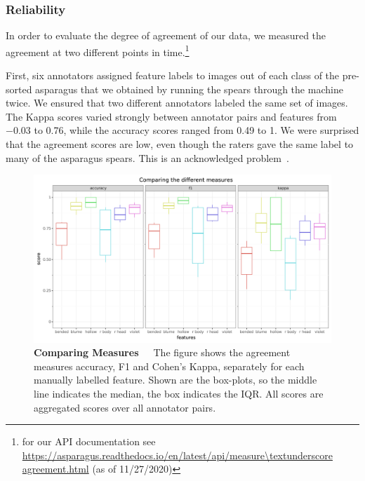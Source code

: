 \subsubsection{Reliability}
\label{subsec:Reliability}

In order to evaluate the degree of agreement of our data, we measured the agreement at two different points in time.\footnote{for our API documentation see \url{https://asparagus.readthedocs.io/en/latest/api/measure\textunderscore agreement.html} (as of 11/27/2020)}

First, six annotators assigned feature labels to images out of each class of the pre-sorted asparagus that we obtained by running the spears through the machine twice. We ensured that two different annotators labeled the same set of images. The Kappa scores varied strongly between annotator pairs and features from $-0.03$ to 0.76, while the accuracy scores ranged from 0.49 to 1. We were surprised that the agreement scores are low, even though the raters gave the same label to many of the asparagus spears. This is an acknowledged problem~\citep{powers2012problem,sim2005kappa,feinstein1990high,posterFlight}.

\begin{figure}[!ht]
    \centering
    \includegraphics[scale=0.55]{Figures/chapter03/kappa_measurewise.png}
    \decoRule
    \caption[Agreement Measure-Wise Comparison of all Features]{\textbf{Comparing Measures}~~~The figure shows the agreement measures accuracy, F1 and Cohen’s Kappa, separately for each manually labelled feature. Shown are the box-plots, so the middle line indicates the median, the box indicates the IQR. All scores are aggregated scores over all annotator pairs.}
    \label{fig:KappaMeasurewise}
\end{figure}

